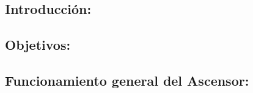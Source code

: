 
\subsection{Introducción:}

\subsection{Objetivos:}

\subsection{Funcionamiento general del Ascensor:}